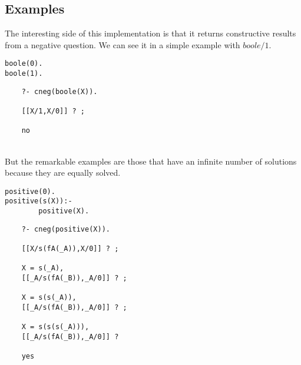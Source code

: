 \documentclass{llncs}
\begin{document}

\subsection{Examples}
\label{examples}

The interesting side of this implementation is that it returns
constructive results from a negative question. We can see it in a
simple example with $boole/1$.

\begin{minipage}{2in}
\begin{verbatim}
boole(0).
boole(1).
\end{verbatim}
\end{minipage}
\begin{minipage}{2in}
\begin{verbatim} 
    ?- cneg(boole(X)).

    [[X/1,X/0]] ? ;

    no
\end{verbatim} 
\end{minipage}\\

But the remarkable examples are those that have an infinite number of
solutions because they are equally solved.

\begin{minipage}{2in}
\begin{verbatim}
positive(0). 
positive(s(X)):-
        positive(X).  
\end{verbatim}
\end{minipage}
\begin{minipage}{2in}
\begin{verbatim} 
    ?- cneg(positive(X)).

    [[X/s(fA(_A)),X/0]] ? ;

    X = s(_A),
    [[_A/s(fA(_B)),_A/0]] ? ;

    X = s(s(_A)),
    [[_A/s(fA(_B)),_A/0]] ? ;

    X = s(s(s(_A))),
    [[_A/s(fA(_B)),_A/0]] ? 

    yes
\end{verbatim} 
\end{minipage}
\end{document}
